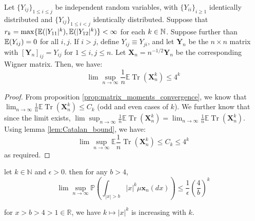\begin{lemma}
    \label{lem:bound_for_expectation_trace}
    \notready
    Let $\{Y_{ij}\}_{1 \leq i \leq j}$ be independent random variables, with $\{Y_{ii}\}_{i\geq 1}$ identically distributed and $\{Y_{ij}\}_{1 \leq i < j}$ identically distributed. Suppose that $r_k = \max\{\mathbb{E}(|Y_{11}|^k),\mathbb{E}(|Y_{12}|^k)\} < \infty$ for each $k\in\mathbb{N}$. Suppose further than $\mathbb{E}(Y_{ij})=0$ for all $i,j$. If $i>j$, define $Y_{ij} \equiv Y_{ji}$, and let $\mathbf{Y}_n$ be the $n\times n$ matrix with $[\mathbf{Y}_n]_{ij} = Y_{ij}$ for $1\le i,j\le n$. Let $\mathbf{X}_n = n^{-1/2}\mathbf{Y}_n$ be the corresponding Wigner matrix. Then, we have:
    $$
    \lim \sup_{n\to\infty} \frac{1}{n}\mathbb{E}\operatorname{Tr} (\mathbf{X}_{n}^{k}) \leq 4^{k}
    $$ 
\end{lemma}
\begin{proof}
    From proposition \ref{prop:matrix_moments_convergence}, we know that $\lim_{n\to\infty} \frac{1}{n}\mathbb{E}\operatorname{Tr}(\mathbf{X}_{n}^{k}) \leq C_{k}$ (odd and even cases of $k$). We further know that since the limit exists, $\lim \sup_{n\to\infty} \frac{1}{n}\mathbb{E}\operatorname{Tr}(\mathbf{X}_{n}^{k}) = \lim_{n\to\infty} \frac{1}{n}\mathbb{E}\operatorname{Tr}(\mathbf{X}_{n}^{k})$. Using lemma \ref{lem:Catalan_bound}, we have:
     $$
     \lim \sup_{n\to\infty }\mathbb{E}\frac{1}{n}\operatorname{Tr}(\mathbf{X}_{n}^{k}) \leq C_{k} \leq 4^{k}
    $$ 
    as required.
\end{proof}

\begin{lemma}
    \label{lem:new_bound_for_lim_sup_p}
    \notready
    let $k \in \mathbb{N}$ and  $\epsilon > 0$. then for any  $b > 4$, 
     $$
    \lim \sup_{n\to\infty} \mathbb{P}(\int_{|x| > b}|x|^{k} \mu \mathbf{x}_{n}(dx)) \leq \frac{1}{\epsilon}(\frac{4}{b})^{k}
    $$ 
\end{lemma}

\begin{lemma}
    \label{lem:increasing_sequence_x_to_k}
    \notready

    for $x > b > 4 > 1 \in \mathbb{R}$, we have $k \mapsto |x|^{k}$ is increasing with $k$.
\end{lemma}

